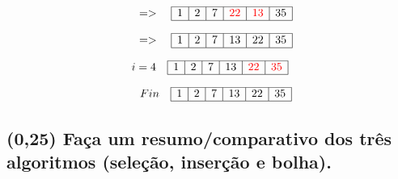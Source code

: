\documentclass{article}
\begin{document}
\[
    \quad => \quad
\begin{array}{|c|c|c|c|c|c|}
\hline
1 & 2 & 7 & \textcolor{red}{22} & \textcolor{red}{13} & 35 \\ 
\hline
\end{array}
\]

\[
    \quad => \quad
\begin{array}{|c|c|c|c|c|c|}
\hline
1 & 2 & 7 & 13 & 22 & 35 \\ 
\hline
\end{array}
\]

\[
i = 4 \quad
\begin{array}{|c|c|c|c|c|c|}
\hline
1 & 2 & 7 & 13 & \textcolor{red}{22} & \textcolor{red}{35} \\ 
\hline
\end{array}
\]

\[
    \quad Fin \quad
\begin{array}{|c|c|c|c|c|c|}
\hline
1 & 2 & 7 & 13 & 22 & 35 \\ 
\hline
\end{array}
\]

\subsection {(0,25) Faça um resumo/comparativo dos três algoritmos (seleção, inserção e bolha).}

\begin{table}[H]
    \caption{Comparativo dos três algoritmos quadráticos}

\end{table}
\end{document}
